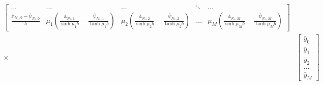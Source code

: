 \begin{align}
\begin{bmatrix}
%
... & ... & ... & \ddots & ... \\
%
%
\frac{\mathbb{A}_{N_1,0} - \bar{\psi}_{N_1,0}}{b} & \scriptstyle\mu_1 \left(\frac{\mathbb{A}_{N_1,1}}{\sinh\mu_1 b} - \frac{\bar{\psi}_{N_1, 1}}{\tanh\mu_1 b}\right) & \scriptstyle\mu_2 \left(\frac{\mathbb{A}_{N_1,2}}{\sinh\mu_2 b} - \frac{\bar{\psi}_{N_1, 2}}{\tanh\mu_2 b}\right) & ... & \scriptstyle\mu_M \left(\frac{\mathbb{A}_{N_1,M}}{\sinh\mu_M b} - \frac{\bar{\psi}_{N_1, M}}{\tanh\mu_M b}\right)
\end{bmatrix} \nonumber \\
\times
%
&
\begin{bmatrix}
\scriptstyle\bar{y}_0 \\ \scriptstyle\bar{y}_1 \\ \scriptstyle\bar{y}_2 \\ ... \\ \scriptstyle\bar{y}_M
\end{bmatrix}
\end{align}

